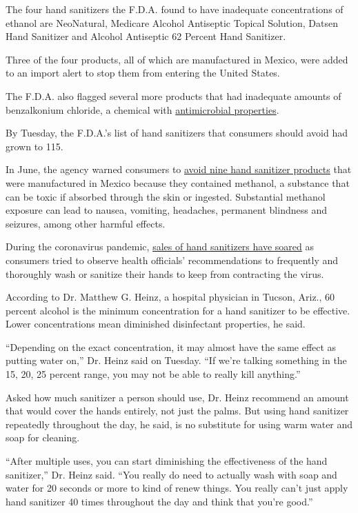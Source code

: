 The four hand sanitizers the F.D.A. found to have inadequate
concentrations of ethanol are NeoNatural, Medicare Alcohol Antiseptic
Topical Solution, Datsen Hand Sanitizer and Alcohol Antiseptic 62
Percent Hand Sanitizer.

Three of the four products, all of which are manufactured in Mexico,
were added to an import alert to stop them from entering the United
States.

The F.D.A. also flagged several more products that had inadequate
amounts of benzalkonium chloride, a chemical with
\href{https://www.ncbi.nlm.nih.gov/pmc/articles/PMC6581159/}{antimicrobial
properties}.

By Tuesday, the F.D.A.'s list of hand sanitizers that consumers should
avoid had grown to 115.

In June, the agency warned consumers to
\href{https://www.nytimes3xbfgragh.onion/2020/06/22/health/fda-Eskbiochem-toxic-hand-sanitizer-virus.html}{avoid
nine hand sanitizer products} that were manufactured in Mexico because
they contained methanol, a substance that can be toxic if absorbed
through the skin or ingested. Substantial methanol exposure can lead to
nausea, vomiting, headaches, permanent blindness and seizures, among
other harmful effects.

During the coronavirus pandemic,
\href{https://www.nytimes3xbfgragh.onion/2020/03/11/smarter-living/wirecutter/coronavirus-hand-sanitizer.html}{sales
of hand sanitizers have soared} as consumers tried to observe health
officials' recommendations to frequently and thoroughly wash or sanitize
their hands to keep from contracting the virus.

According to Dr. Matthew G. Heinz, a hospital physician in Tucson,
Ariz., 60 percent alcohol is the minimum concentration for a hand
sanitizer to be effective. Lower concentrations mean diminished
disinfectant properties, he said.

``Depending on the exact concentration, it may almost have the same
effect as putting water on,'' Dr. Heinz said on Tuesday. ``If we're
talking something in the 15, 20, 25 percent range, you may not be able
to really kill anything.''

Asked how much sanitizer a person should use, Dr. Heinz recommend an
amount that would cover the hands entirely, not just the palms. But
using hand sanitizer repeatedly throughout the day, he said, is no
substitute for using warm water and soap for cleaning.

``After multiple uses, you can start diminishing the effectiveness of
the hand sanitizer,'' Dr. Heinz said. ``You really do need to actually
wash with soap and water for 20 seconds or more to kind of renew things.
You really can't just apply hand sanitizer 40 times throughout the day
and think that you're good.''

